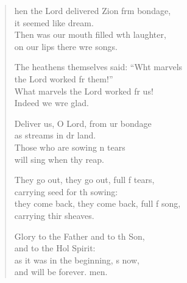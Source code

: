 \settowidth{\versewidth}{they come back, they come back, full of song, *}
\begin{verse}%
  \begin{patverse}
hen the Lord delivered Zion frm bondage,\Med\\
it seemed like  dream.\\
Then was our mouth filled w\pointup{\i}th laughter,\Med\\
on our lips there wre songs.

The heathens themselves said: “Wht marvels\Med\\
the Lord worked fr them!”\\
What marvels the Lord worked fr us!\Med\\
Indeed we wre glad.

Deliver us, O Lord, from ur bondage\Med\\
as streams in dr land.\\
Those who are sowing \pointup{\i}n tears\Med\\
will sing when thy reap.

They go out, they go out, full f tears,\Med\\
carrying seed for th sowing:\\
they come back, they come back, full f song,\Med\\
carrying thir sheaves.

Glory to the Father and to th Son,\Med\\
and to the Hol Spirit:\\
as it was in the beginning, \pointup{\i}s now,\Med\\
and will be forever. men. 
  \end{patverse}
\end{verse}
